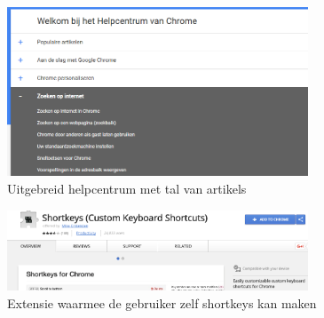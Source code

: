 \documentclass[12pt]{article}
\begin{document}
\begin{figure}
	\centering
	\includegraphics[width=0.8\textwidth]{helpcentrum.png}
	\caption{Uitgebreid helpcentrum met tal van artikels}
	\label{fig:helpcentrum}
\end{figure}
\begin{figure}
	\centering
	\includegraphics[width=0.8\textwidth]{shortkeys.png}
	\caption{Extensie waarmee de gebruiker zelf shortkeys kan maken}
	\label{fig:shortkeys}
\end{figure}
\end{document}
